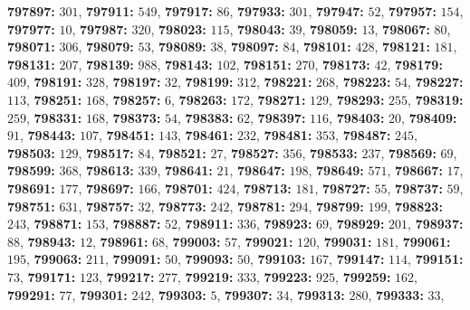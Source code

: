\textsf{\bfseries 797897:} $301$, \textsf{\bfseries 797911:} $549$, \textsf{\bfseries 797917:} $86$, \textsf{\bfseries 797933:} $301$, \textsf{\bfseries 797947:} $52$, \textsf{\bfseries 797957:} $154$, \textsf{\bfseries 797977:} $10$, \textsf{\bfseries 797987:} $320$, \textsf{\bfseries 798023:} $115$, \textsf{\bfseries 798043:} $39$, \textsf{\bfseries 798059:} $13$, \textsf{\bfseries 798067:} $80$, \textsf{\bfseries 798071:} $306$, \textsf{\bfseries 798079:} $53$, \textsf{\bfseries 798089:} $38$, \textsf{\bfseries 798097:} $84$, \textsf{\bfseries 798101:} $428$, \textsf{\bfseries 798121:} $181$, \textsf{\bfseries 798131:} $207$, \textsf{\bfseries 798139:} $988$, \textsf{\bfseries 798143:} $102$, \textsf{\bfseries 798151:} $270$, \textsf{\bfseries 798173:} $42$, \textsf{\bfseries 798179:} $409$, \textsf{\bfseries 798191:} $328$, \textsf{\bfseries 798197:} $32$, \textsf{\bfseries 798199:} $312$, \textsf{\bfseries 798221:} $268$, \textsf{\bfseries 798223:} $54$, \textsf{\bfseries 798227:} $113$, \textsf{\bfseries 798251:} $168$, \textsf{\bfseries 798257:} $6$, \textsf{\bfseries 798263:} $172$, \textsf{\bfseries 798271:} $129$, \textsf{\bfseries 798293:} $255$, \textsf{\bfseries 798319:} $259$, \textsf{\bfseries 798331:} $168$, \textsf{\bfseries 798373:} $54$, \textsf{\bfseries 798383:} $62$, \textsf{\bfseries 798397:} $116$, \textsf{\bfseries 798403:} $20$, \textsf{\bfseries 798409:} $91$, \textsf{\bfseries 798443:} $107$, \textsf{\bfseries 798451:} $143$, \textsf{\bfseries 798461:} $232$, \textsf{\bfseries 798481:} $353$, \textsf{\bfseries 798487:} $245$, \textsf{\bfseries 798503:} $129$, \textsf{\bfseries 798517:} $84$, \textsf{\bfseries 798521:} $27$, \textsf{\bfseries 798527:} $356$, \textsf{\bfseries 798533:} $237$, \textsf{\bfseries 798569:} $69$, \textsf{\bfseries 798599:} $368$, \textsf{\bfseries 798613:} $339$, \textsf{\bfseries 798641:} $21$, \textsf{\bfseries 798647:} $198$, \textsf{\bfseries 798649:} $571$, \textsf{\bfseries 798667:} $17$, \textsf{\bfseries 798691:} $177$, \textsf{\bfseries 798697:} $166$, \textsf{\bfseries 798701:} $424$, \textsf{\bfseries 798713:} $181$, \textsf{\bfseries 798727:} $55$, \textsf{\bfseries 798737:} $59$, \textsf{\bfseries 798751:} $631$, \textsf{\bfseries 798757:} $32$, \textsf{\bfseries 798773:} $242$, \textsf{\bfseries 798781:} $294$, \textsf{\bfseries 798799:} $199$, \textsf{\bfseries 798823:} $243$, \textsf{\bfseries 798871:} $153$, \textsf{\bfseries 798887:} $52$, \textsf{\bfseries 798911:} $336$, \textsf{\bfseries 798923:} $69$, \textsf{\bfseries 798929:} $201$, \textsf{\bfseries 798937:} $88$, \textsf{\bfseries 798943:} $12$, \textsf{\bfseries 798961:} $68$, \textsf{\bfseries 799003:} $57$, \textsf{\bfseries 799021:} $120$, \textsf{\bfseries 799031:} $181$, \textsf{\bfseries 799061:} $195$, \textsf{\bfseries 799063:} $211$, \textsf{\bfseries 799091:} $50$, \textsf{\bfseries 799093:} $50$, \textsf{\bfseries 799103:} $167$, \textsf{\bfseries 799147:} $114$, \textsf{\bfseries 799151:} $73$, \textsf{\bfseries 799171:} $123$, \textsf{\bfseries 799217:} $277$, \textsf{\bfseries 799219:} $333$, \textsf{\bfseries 799223:} $925$, \textsf{\bfseries 799259:} $162$, \textsf{\bfseries 799291:} $77$, \textsf{\bfseries 799301:} $242$, \textsf{\bfseries 799303:} $5$, \textsf{\bfseries 799307:} $34$, \textsf{\bfseries 799313:} $280$, \textsf{\bfseries 799333:} $33$, 
